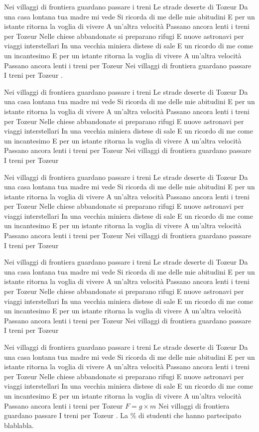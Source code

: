 \documentclass[12pt]{article}
\begin{document}
Nei villaggi di frontiera guardano passare i treni
Le strade deserte di Tozeur
Da una casa lontana tua madre mi vede
Si ricorda di me delle mie abitudini
E per un istante ritorna la voglia di vivere
A un'altra velocità
Passano ancora lenti i treni per Tozeur
Nelle chiese abbandonate si preparano rifugi
E nuove astronavi per viaggi interstellari
In una vecchia miniera distese di sale
E un ricordo di me come un incantesimo
E per un istante ritorna la voglia di vivere
A un'altra velocità
Passano ancora lenti i treni per Tozeur
Nei villaggi di frontiera guardano passare
I treni per Tozeur \citep{Uyen2025}.

Nei villaggi di frontiera guardano passare i treni
Le strade deserte di Tozeur
Da una casa lontana tua madre mi vede
Si ricorda di me delle mie abitudini
E per un istante ritorna la voglia di vivere
A un'altra velocità
Passano ancora lenti i treni per Tozeur
Nelle chiese abbandonate si preparano rifugi
E nuove astronavi per viaggi interstellari
In una vecchia miniera distese di sale
E un ricordo di me come un incantesimo
E per un istante ritorna la voglia di vivere
A un'altra velocità
Passano ancora lenti i treni per Tozeur
Nei villaggi di frontiera guardano passare
I treni per Tozeur

Nei villaggi di frontiera guardano passare i treni
Le strade deserte di Tozeur
Da una casa lontana tua madre mi vede
Si ricorda di me delle mie abitudini
E per un istante ritorna la voglia di vivere
A un'altra velocità
Passano ancora lenti i treni per Tozeur
Nelle chiese abbandonate si preparano rifugi
E nuove astronavi per viaggi interstellari
In una vecchia miniera distese di sale
E un ricordo di me come un incantesimo
E per un istante ritorna la voglia di vivere
A un'altra velocità
Passano ancora lenti i treni per Tozeur
Nei villaggi di frontiera guardano passare
I treni per Tozeur

Nei villaggi di frontiera guardano passare i treni
Le strade deserte di Tozeur
Da una casa lontana tua madre mi vede
Si ricorda di me delle mie abitudini
E per un istante ritorna la voglia di vivere
A un'altra velocità
Passano ancora lenti i treni per Tozeur
Nelle chiese abbandonate si preparano rifugi
E nuove astronavi per viaggi interstellari
In una vecchia miniera distese di sale
E un ricordo di me come un incantesimo
E per un istante ritorna la voglia di vivere
A un'altra velocità
Passano ancora lenti i treni per Tozeur
Nei villaggi di frontiera guardano passare
I treni per Tozeur

Nei villaggi di frontiera guardano passare i treni
Le strade deserte di Tozeur
Da una casa lontana tua madre mi vede
Si ricorda di me delle mie abitudini
E per un istante ritorna la voglia di vivere
A un'altra velocità
Passano ancora lenti i treni per Tozeur
Nelle chiese abbandonate si preparano rifugi
E nuove astronavi per viaggi interstellari
In una vecchia miniera distese di sale
E un ricordo di me come un incantesimo
E per un istante ritorna la voglia di vivere
A un'altra velocità 
Passano ancora lenti i treni per Tozeur $F=g \times m$
Nei villaggi di frontiera guardano passare
I treni per Tozeur \citep{Nat1990}.
La \% di studenti che hanno partecipato blablabla.
\end{document}
